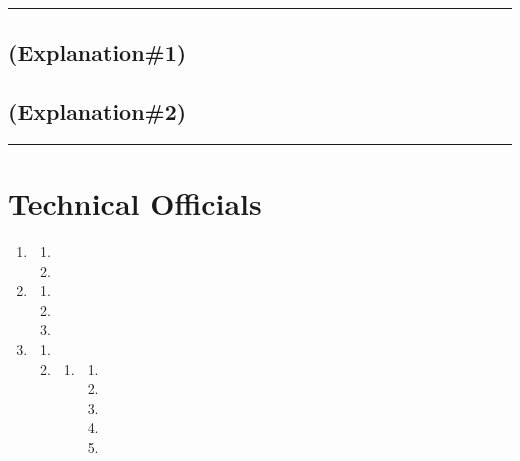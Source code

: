 \documentclass[draft]{report}
\newenvironment{expl}[0]%
  {\rule{\textwidth}{.2pt}\footnotesize}%
  {\rule{\textwidth}{.2pt}\normalsize}
\begin{document}
\begin{expl}
\section{(Explanation\#1)}

\section{(Explanation\#2)}

\end{expl}


\chapter{Technical Officials}\label{officials}

\begin{enumerate}
\item

    \begin{enumerate}
    \item
    
    \item
    
    \end{enumerate}
\item

    \begin{enumerate}
    \item
    
    \item
    
    \item
    
    \end{enumerate}
\item

    \begin{enumerate}
    \item
    
    \item
    
        \begin{enumerate}
        \item
        
            \begin{enumerate}
            \item
            
            \item
            
            \item
            
            \item
            
            \item
            
            \end{enumerate}

\end{enumerate}
\end{enumerate}
\end{enumerate}
\end{document}
